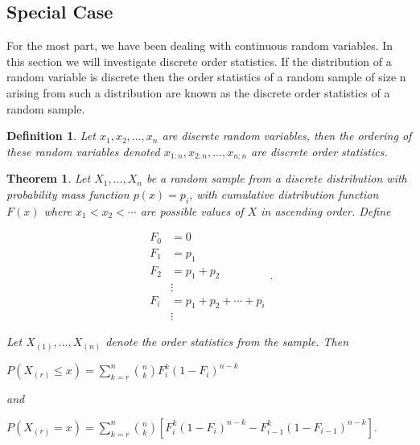 \documentclass[11pt,a4paper]{article}
\theoremstyle{plain}
\newtheorem{thm}[fact]{Theorem}
\newtheorem{de}[fact]{Definition}
\begin{document}
\subsection{Special Case}
For the most part, we have been dealing with continuous random variables. In this section we will investigate discrete order statistics. If the distribution of a random variable is discrete then the order statistics of a random sample of size n arising from such a distribution are known as the discrete order statistics of a random sample. 
 
\begin{de}
Let $x_1,x_2,...,x_n$ are discrete random variables, then the ordering of these random variables denoted $x_{1:n}, x_{2:n},...,x_{n:n}$ are discrete order statistics.
\end{de}

\begin{thm}
 Let $X_1,...,X_n$ be a random sample from a discrete distribution with probability mass function $p(x)=p_i$,  with cumulative distribution function $F(x)$ where $x_1<x_2<\cdots$ are possible values of $X$ in ascending order. Define
 \begin{center}
 

                
 \[
     \begin{array}{ll}
                 F_0&=0\\
             F_1&=p_1 \\
                  F_2&=p_1+p_2\\
                  &\vdots\\
                  F_i&=p_1+p_2+\cdots+p_i\\
                  &\vdots
                \end{array}
             .
  \]

 \end{center}
Let $X_({1}),...,X_{(n)}$ denote the order statistics from the sample. Then

\begin{center}
$P(X_{(r)}\leq x)=\sum_{k=r}^n \binom{n}{k}F_i^k(1-F_i)^{n-k}$
\end{center}

and
 \begin{center}
 $P(X_{(r)}=x)=\sum_{k=r}^n \binom{n}{k}[F_i^k(1-F_i)^{n-k}-F_{i-1}^k(1-F_{i-1})^{n-k}].$
 \end{center}
 
\end{thm}
\end{document}
